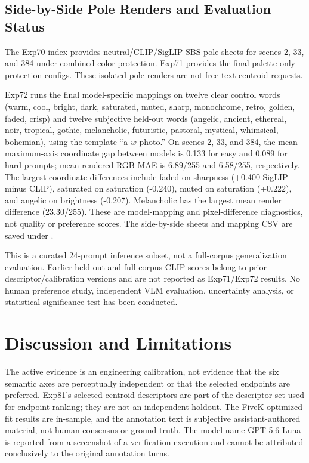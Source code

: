 \documentclass[journal]{IEEEtran}
\begin{document}
\subsection{Side-by-Side Pole Renders and Evaluation Status}
The Exp70 index provides neutral/CLIP/SigLIP SBS pole sheets for scenes 2, 33, and 384 under combined color protection. Exp71 provides the final palette-only protection configs. These isolated pole renders are not free-text centroid requests.

Exp72 runs the final model-specific mappings on twelve clear control words (warm, cool, bright, dark, saturated, muted, sharp, monochrome, retro, golden, faded, crisp) and twelve subjective held-out words (angelic, ancient, ethereal, noir, tropical, gothic, melancholic, futuristic, pastoral, mystical, whimsical, bohemian), using the template ``a $w$ photo.'' On scenes 2, 33, and 384, the mean maximum-axis coordinate gap between models is 0.133 for easy and 0.089 for hard prompts; mean rendered RGB MAE is 6.89/255 and 6.58/255, respectively. The largest coordinate differences include faded on sharpness (+0.400 SigLIP minus CLIP), saturated on saturation (-0.240), muted on saturation (+0.222), and angelic on brightness (-0.207). Melancholic has the largest mean render difference (23.30/255). These are model-mapping and pixel-difference diagnostics, not quality or preference scores. The side-by-side sheets and mapping CSV are saved under .

This is a curated 24-prompt inference subset, not a full-corpus generalization evaluation. Earlier held-out and full-corpus CLIP scores belong to prior descriptor/calibration versions and are not reported as Exp71/Exp72 results. No human preference study, independent VLM evaluation, uncertainty analysis, or statistical significance test has been conducted.

\section{Discussion and Limitations}
The active evidence is an engineering calibration, not evidence that the six semantic axes are perceptually independent or that the selected endpoints are preferred. Exp81's selected centroid descriptors are part of the descriptor set used for endpoint ranking; they are not an independent holdout. The FiveK optimized fit results are in-sample, and the annotation text is subjective assistant-authored material, not human consensus or ground truth. The model name GPT-5.6 Luna is reported from a screenshot of a verification execution and cannot be attributed conclusively to the original annotation turns.
\end{document}
